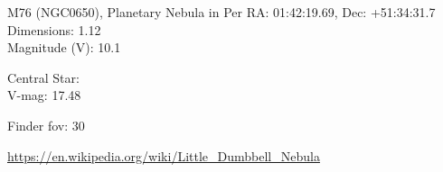 \begin{block}{M76 (NGC0650), Planetary Nebula in Per}
    RA: 01:42:19.69, Dec: +51:34:31.7 \\ 
    Dimensions: 1.12 \\ 
    Magnitude (V): 10.1

    Central Star: \\ 
      \hspace{1em}V-mag: 17.48 


    Finder fov: 30 

    \url{https://en.wikipedia.org/wiki/Little_Dumbbell_Nebula} 
\end{block}